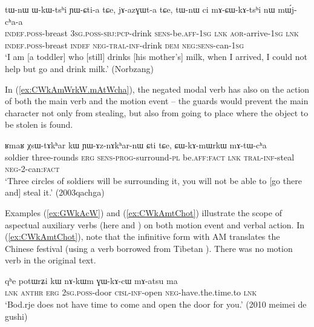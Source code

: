 \begin{exe}
\ex \label{ex:mACWkAtshi}
\gll  tɯ-nɯ ɯ-kɯ-tsʰi ɲɯ-ɕti-a tɕe, jɤ-azɣɯt-a tɕe, tɯ-nɯ ci mɤ-ɕɯ-kɤ-tsʰi nɯ mɯ́j-cʰa-a \\
\textsc{indef}.\textsc{poss}-breast \textsc{3sg}.\textsc{poss}-\textsc{sbj}:\textsc{pcp}-drink \textsc{sens}-be.\textsc{aff}-\textsc{1sg} \textsc{lnk} \textsc{aor}-arrive-\textsc{1sg} \textsc{lnk} \textsc{indef}.\textsc{poss}-breast  \textsc{indef} \textsc{neg}-\textsc{tral}-\textsc{inf}-drink \textsc{dem} \textsc{neg}:\textsc{sens}-can-\textsc{1sg} \\
\glt `I am [a toddler] who [still] drinks [his mother's] milk, when I arrived, I could not help but go and drink milk.'  (Norbzang)
 \end{exe}
 
 In (\ref{ex:CWkAmWrkW.mAtWcha}), the negated modal verb has also on the action of both the main verb and the motion event -- the guards would prevent the main character not only from stealing, but also from going to place where the object to be stolen is found. 
 
\begin{exe}
\ex \label{ex:CWkAmWrkW.mAtWcha}
\gll ʁmaʁ χsɯ-tɤkʰar kɯ ɲɯ-ɤz-nɤkʰar-nɯ ɕti tɕe, ɕɯ-kɤ-mɯrkɯ mɤ-tɯ-cʰa  \\
soldier three-rounds \textsc{erg} \textsc{sens}-\textsc{prog}-surround-\textsc{pl} be.\textsc{aff}:\textsc{fact} \textsc{lnk}  \textsc{tral}-\textsc{inf}-steal \textsc{neg}-2-can:\textsc{fact} \\
\glt `Three circles of soldiers will be surrounding it, you will not be able to [go there and] steal it.' (2003qachga)
   \end{exe}
   
 Examples (\ref{ex:GWkAcW}) and (\ref{ex:CWkAmtChot}) illustrate the scope of aspectual  auxiliary verbs (here   and ) on both motion event and verbal action.  In (\ref{ex:CWkAmtChot}), note that the infinitive form with AM   translates the Chinese festival  (using a verb borrowed from Tibetan  ). There was no motion verb in the original text.
 
\begin{exe}
\ex \label{ex:GWkAcW}
\gll qʰe potɯrʑi kɯ nɤ-kɯm ɣɯ-kɤ-cɯ mɤ-atsu ma \\
\textsc{lnk}  \textsc{anthr} \textsc{erg} \textsc{2sg}.\textsc{poss}-door \textsc{cisl}-\textsc{inf}-open \textsc{neg}-have.the.time.to \textsc{lnk} \\
\glt `Bod.rje does not have time to come and open the door for you.' (2010 meimei de gushi)
\end{exe} 
  
